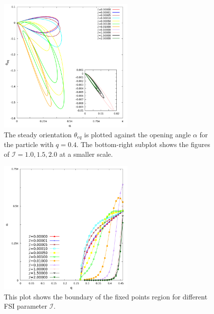\documentclass[a4paper,12pt]{report}
\begin{document}
\begin{figure}[!h]
	\begin{center}
		\includegraphics[width=0.6\textwidth]{plot/elastic_beam_alpha_theta_eq_q_0.400.png}
		\caption{The steady orientation $\theta_{eq}$ is plotted against  the opening angle $\alpha$ for the particle with $q = 0.4$. The bottom-right subplot shows the figures of $\mathcal{I}=1.0, 1.5, 2.0$ at a smaller scale.}
		\label{fig:14}
	\end{center}
\end{figure}
\begin{figure}[!h]
	\begin{center}
		\includegraphics[width=0.6\textwidth]{plot/elastic_beam_general.png}
		\caption{This plot shows the boundary of the fixed points region for different FSI parameter $\mathcal{I}$.}
		\label{fig:15}
	\end{center}
\end{figure}
\end{document}
